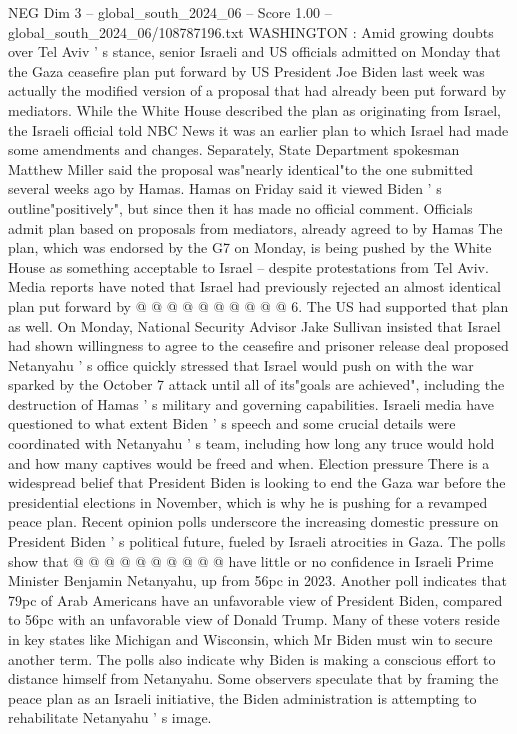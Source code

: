 \begin{textsample}{NEG Dim 3 – global\_south\_2024\_06 – Score 1.00 – global\_south\_2024\_06/108787196.txt}  \label{ex:f3_neg_116}
WASHINGTON : Amid growing doubts over Tel Aviv ' s stance, senior Israeli and US officials admitted on Monday that the Gaza ceasefire plan put forward by US President Joe Biden last week was actually the modified version of a proposal that had already been put forward by mediators.
While the White House described the plan as originating from Israel, the Israeli official told NBC News it was an earlier plan to which Israel had made some amendments and changes.
Separately, State Department spokesman Matthew Miller said the proposal was"nearly identical"to the one submitted several weeks ago by Hamas.
Hamas on Friday said it viewed Biden ' s outline"positively", but since then it has made no official comment.
Officials admit plan based on proposals from mediators, already agreed to by Hamas The plan, which was endorsed by the G7 on Monday, is being pushed by the White House as something acceptable to Israel -- despite protestations from Tel Aviv.
Media reports have noted that Israel had previously rejected an almost identical plan put forward by @ @ @ @ @ @ @ @ @ @ 6.
The US had supported that plan as well.
On Monday, National Security Advisor Jake Sullivan insisted that Israel had shown willingness to agree to the ceasefire and prisoner release deal proposed Netanyahu ' s office quickly stressed that Israel would push on with the war sparked by the October 7 attack until all of its"goals are achieved", including the destruction of Hamas ' s military and governing capabilities.
Israeli media have questioned to what extent Biden ' s speech and some crucial details were coordinated with Netanyahu ' s team, including how long any truce would hold and how many captives would be freed and when.
Election pressure There is a widespread belief that President Biden is looking to end the Gaza war before the presidential elections in November, which is why he is pushing for a revamped peace plan.
Recent opinion polls underscore the increasing domestic pressure on President Biden ' s political future, fueled by Israeli atrocities in Gaza.
The polls show that @ @ @ @ @ @ @ @ @ @ have little or no confidence in Israeli Prime Minister Benjamin Netanyahu, up from 56pc in 2023.
Another poll indicates that 79pc of Arab Americans have an unfavorable view of President Biden, compared to 56pc with an unfavorable view of Donald Trump.
Many of these voters reside in key states like Michigan and Wisconsin, which Mr Biden must win to secure another term.
The polls also indicate why Biden is making a conscious effort to distance himself from Netanyahu.
Some observers speculate that by framing the peace plan as an Israeli initiative, the Biden administration is attempting to rehabilitate Netanyahu ' s image.

\end{textsample}
